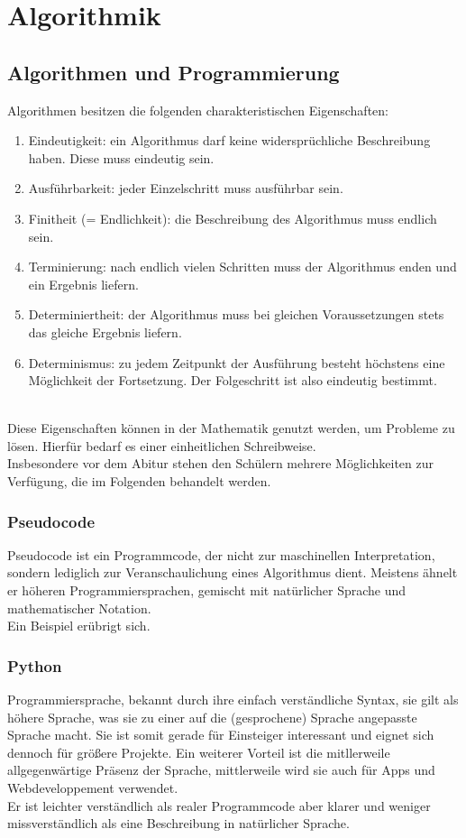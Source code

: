 \chapter{Algorithmik}
\section{Algorithmen und Programmierung}
\begin{Definition}
	Algorithmen besitzen die folgenden charakteristischen Eigenschaften:
	\begin{enumerate}
		\item Eindeutigkeit: ein Algorithmus darf keine widersprüchliche Beschreibung haben. Diese muss eindeutig sein.
		\item Ausführbarkeit: jeder Einzelschritt muss ausführbar sein.
		\item Finitheit (= Endlichkeit): die Beschreibung des Algorithmus muss endlich sein.
		\item Terminierung: nach endlich vielen Schritten muss der Algorithmus enden und ein Ergebnis liefern.
		\item Determiniertheit: der Algorithmus muss bei gleichen Voraussetzungen stets das gleiche Ergebnis liefern.
		\item   Determinismus: zu jedem Zeitpunkt der Ausführung besteht höchstens eine Möglichkeit der Fortsetzung. Der Folgeschritt ist also eindeutig bestimmt.
	\end{enumerate}
\end{Definition}
\\
Diese Eigenschaften können in der Mathematik genutzt werden, um Probleme zu lösen. Hierfür bedarf es einer einheitlichen Schreibweise.\\
Insbesondere vor dem Abitur stehen den Schülern mehrere Möglichkeiten zur Verfügung, die im Folgenden behandelt werden.
\subsection{Pseudocode}
Pseudocode ist ein Programmcode, der nicht zur maschinellen Interpretation, sondern lediglich zur Veranschaulichung eines Algorithmus dient. Meistens ähnelt er höheren Programmiersprachen, gemischt mit natürlicher Sprache und mathematischer Notation.\\
Ein Beispiel erübrigt sich.
\subsection{Python}
Programmiersprache, bekannt durch ihre einfach verständliche Syntax, sie gilt als höhere Sprache, was sie zu einer auf die (gesprochene) Sprache angepasste Sprache macht. Sie ist somit gerade für Einsteiger interessant und eignet sich dennoch für größere Projekte. Ein weiterer Vorteil ist die mitllerweile allgegenwärtige Präsenz der Sprache, mittlerweile wird sie auch für Apps und Webdeveloppement verwendet.\\
Er ist leichter verständlich als realer Programmcode aber klarer und weniger missverständlich als eine Beschreibung in natürlicher Sprache.
